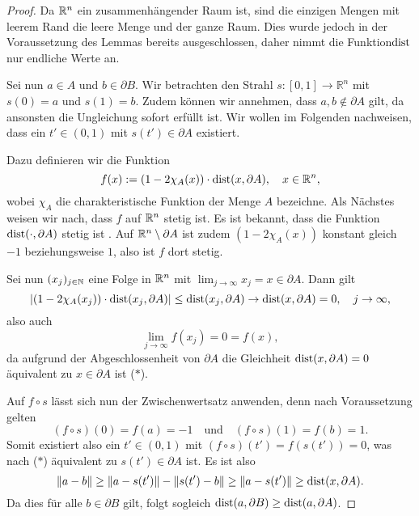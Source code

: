 \begin{proof}
  Da $\mathbb{R}^n$ ein zusammenhängender Raum ist, sind die einzigen Mengen mit leerem Rand die leere Menge und der ganze Raum.
  Dies wurde jedoch in der Voraussetzung des Lemmas bereits ausgeschlossen, daher nimmt die Funktion$\operatorname{dist}$ nur endliche Werte an.

  Sei nun $a \in A$ und $b \in \partial B$.
  Wir betrachten den Strahl $s \colon [0,1] \to \mathbb{R}^n$ mit $s(0) = a$ und $s(1) = b$.
  Zudem können wir annehmen, dass $a,b \not\in \partial A$ gilt, da ansonsten die Ungleichung sofort erfüllt ist.
  Wir wollen im Folgenden nachweisen, dass ein $t' \in (0,1)$ mit $s(t') \in \partial A$ existiert.

  Dazu definieren wir die Funktion
  $$
  f(x) := (1 - 2\chi_A(x)) \cdot \operatorname{dist}(x, \partial A), \quad x \in \mathbb{R}^n,
  $$
  wobei $\chi_A$ die charakteristische Funktion der Menge $A$ bezeichne.
  Als Nächstes weisen wir nach, dass $f$ auf $\mathbb{R}^n$ stetig ist.
  Es ist bekannt, dass die Funktion $\operatorname{dist}(\cdot, \partial A)$ stetig ist \cite[S.14]{koenigsberger2004ana2}.
  Auf $\mathbb{R}^n \setminus \partial A$ ist zudem $(1 - 2\chi_A(x))$ konstant gleich $-1$ beziehungsweise $1$, also ist $f$ dort stetig.

  Sei nun $(x_j)_{j \in \mathbb{N}}$ eine Folge in $\mathbb{R}^n$ mit $\lim_{j \to \infty} x_j = x \in \partial A$.
  Dann gilt
  $$
  |(1 - 2\chi_A(x_j)) \cdot \operatorname{dist}(x_j, \partial A)| 
  \leq \operatorname{dist}(x_j,\partial A)
  \to \operatorname{dist}(x,\partial A) 
  = 0,
  \quad j \to \infty,
  $$
  also auch 
  $$
  \lim_{j \to \infty} f(x_j) = 0 = f(x),
  $$
  da aufgrund der Abgeschlossenheit von $\partial A$ die Gleichheit $\operatorname{dist}(x,\partial A) = 0$ äquivalent zu $x \in \partial A$ ist ($\ast$).

  Auf $f \circ s$ lässt sich nun der Zwischenwertsatz anwenden, denn nach Voraussetzung gelten
  $$
  (f \circ s)(0) = f(a) = -1 \quad\text{und}\quad (f \circ s)(1) = f(b) = 1.
  $$
  Somit existiert also ein $t' \in (0,1)$ mit $(f\circ s)(t') = f(s(t')) = 0$, was nach ($\ast$) äquivalent zu $s(t') \in \partial A$ ist.
  Es ist also
  $$
  \lVert a - b \rVert \geq \lVert a - s(t') \rVert - \lVert s(t') - b \rVert \geq \lVert a - s(t') \rVert \geq \operatorname{dist}(x,\partial A).
  $$
  Da dies für alle $b \in \partial B$ gilt, folgt sogleich $ \operatorname{dist}(a, \partial B) \geq \operatorname{dist}(a, \partial A)$.
\end{proof}


